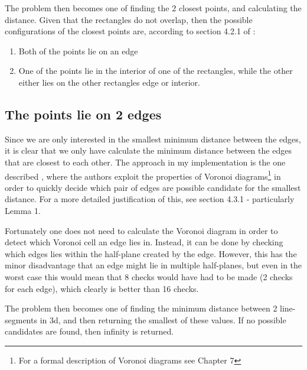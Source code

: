 The problem then becomes one of finding the 2 closest points, and calculating the distance.
Given that the rectangles do not overlap, then the possible configurations of the closest points are, according to section 4.2.1 of \cite{Larsen99fastproximity}:
\begin{enumerate}
\item Both of the points lie on an edge
\item One of the points lie in the interior of one of the rectangles, while the other either lies on the other rectangles edge or interior.
\end{enumerate}

\subsection{The points lie on 2 edges}
Since we are only interested in the smallest minimum distance between the edges, it is clear that we only have calculate the minimum distance between the edges that are closest to each other. The approach in my implementation is the one described \cite{Larsen99fastproximity}, where the authors exploit the properties of Voronoi diagrams\footnote{For a formal description of Voronoi diagrams see \cite{compgeom:2008} Chapter 7} in order to quickly decide which pair of edges are possible candidate for the smallest distance. For a more detailed justification of this, see \cite{Larsen99fastproximity} section 4.3.1 - particularly Lemma 1.  

Fortunately one does not need to calculate the Voronoi diagram in order to detect which Voronoi cell an edge lies in. Instead, it can be done by checking which edges lies within the half-plane created by the edge. However, this has the minor disadvantage that an edge might lie in multiple half-planes, but even in the worst case this would mean that 8 checks would have had to be made (2 checks for each edge), which clearly is better than 16 checks.

The problem then becomes one of finding the minimum distance between 2 line-segments in 3d, and then returning the smallest of these values. If no possible candidates are found, then infinity is returned.


